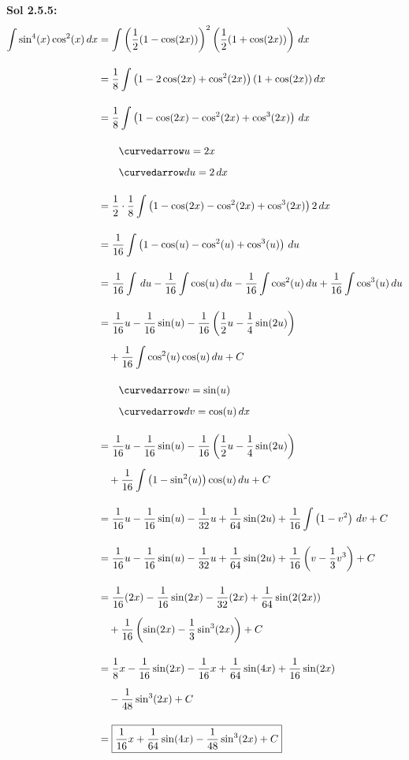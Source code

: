 \begin{tcolorbox}[solution]
    \textbf{Sol 2.5.5: } \begin{align*}
        \int \sin^4 (x)\cos^2 (x) \, dx &= \int \left(\dfrac{1}{2}(1 - \cos (2x))\right)^2\left(\dfrac{1}{2}(1 + \cos (2x))\right) \, dx \\[11pt]
        & = \dfrac{1}{8} \int \left(1 - 2\cos (2x) + \cos^2 (2x)\right)(1 + \cos (2x)) \, dx \\[11pt]
        & = \dfrac{1}{8} \int \left(1 - \cos (2x) - \cos^2 (2x) + \cos^3 (2x)\right) \, dx \\[11pt]
        & \qquad \curvedarrow u = 2x \\[5.5pt]
        & \qquad \curvedarrow du = 2 \, dx \\[11pt]
        & = \dfrac{1}{2} \cdot \dfrac{1}{8} \int \left(1 - \cos (2x) - \cos^2 (2x) + \cos^3 (2x)\right) 2 \, dx \\[11pt]
        & = \dfrac{1}{16} \int \left(1 - \cos (u) - \cos^2 (u) + \cos^3 (u)\right) \, du \\[11pt]
        & = \dfrac{1}{16}\int \, du - \dfrac{1}{16}\int \cos (u) \, du - \dfrac{1}{16}\int \cos^2 (u) \, du + \dfrac{1}{16}\int \cos^3 (u) \, du \\[11pt]
        & = \dfrac{1}{16}u - \dfrac{1}{16}\sin (u) - \dfrac{1}{16}\left(\dfrac{1}{2}u - \dfrac{1}{4}\sin (2u)\right) \\[5.5pt]
        & \quad + \dfrac{1}{16}\int \cos^2 (u)\cos (u) \, du + C \\[11pt]
        & \qquad \curvedarrow v = \sin (u) \\[5.5pt]
        & \qquad \curvedarrow dv = \cos (u) \, dx \\[11pt]
        & = \dfrac{1}{16}u - \dfrac{1}{16}\sin (u) - \dfrac{1}{16}\left(\dfrac{1}{2}u - \dfrac{1}{4}\sin (2u)\right) \\[5.5pt]
        & \quad + \dfrac{1}{16}\int \left(1 - \sin^2 (u)\right)\cos (u) \, du + C \\[11pt]
        & = \dfrac{1}{16}u - \dfrac{1}{16}\sin (u) - \dfrac{1}{32}u + \dfrac{1}{64}\sin (2u) + \dfrac{1}{16}\int \left(1 - v^2\right) \, dv + C \\[11pt]
        & = \dfrac{1}{16}u - \dfrac{1}{16}\sin (u) - \dfrac{1}{32}u + \dfrac{1}{64}\sin (2u) + \dfrac{1}{16}\left(v - \dfrac{1}{3}v^3\right) + C \\[11pt]
        & = \dfrac{1}{16}(2x) - \dfrac{1}{16}\sin (2x) - \dfrac{1}{32}(2x) + \dfrac{1}{64}\sin (2(2x)) \\[5.5pt]
        & \quad + \dfrac{1}{16}\left(\sin(2x) - \dfrac{1}{3}\sin^3 (2x)\right) + C \\[11pt]
        & = \dfrac{1}{8}x - \dfrac{1}{16}\sin (2x) - \dfrac{1}{16}x + \dfrac{1}{64}\sin (4x) + \dfrac{1}{16}\sin (2x) \\[5.5pt]
        & \quad - \dfrac{1}{48}\sin^3 (2x) + C \\[11pt]
        & = \boxed{\dfrac{1}{16}x + \dfrac{1}{64}\sin (4x) - \dfrac{1}{48}\sin^3 (2x) + C}
    \end{align*}
\end{tcolorbox}

